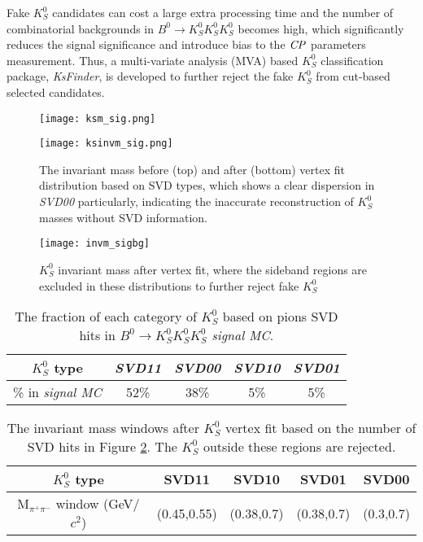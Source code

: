 Fake $K_S^0$ candidates can cost a large extra processing time and the number of combinatorial backgrounds in $B^0 \to K_S^0  K_S^0  K_S^0$ becomes high, which significantly reduces the signal significance and introduce bias to the $\it{CP}$ parameters measurement. Thus, a multi-variate analysis (MVA) based $K_S^0$ classification package, \textit{KsFinder}, is developed to further reject the fake $K_S^0$ from cut-based selected candidates.


\begin{figure}[htpb]
	\begin{minipage}[b]{1\linewidth}
		\centering 
		\texttt{[image: ksm\_sig.png]}
	\end{minipage}
	\begin{minipage}[b]{1\linewidth}
		\centering 
		\texttt{[image: ksinvm\_sig.png]}
	\end{minipage}
	\caption{The invariant mass before (top) and after (bottom) vertex fit distribution based on SVD types, which shows a clear dispersion in \textit{SVD00} particularly, indicating the inaccurate reconstruction of $K_S^0$ masses without SVD information.}
	\label{fig:invm1}
\end{figure}

\begin{figure}[htpb]
	\centering
	\texttt{[image: invm\_sigbg]}
	\caption{$K_S^0$ invariant mass after vertex fit, where the sideband regions are excluded in these distributions to further reject fake $K_S^0$}
	\label{fig:invm}
\end{figure}

\begin{table}[H]
	\centering
	\begin{tabular}{|c|c|c|c|c|}
		\hline
		$K_S^0$ type & \textit{SVD11} & \textit{SVD00} & \textit{SVD10} & \textit{SVD01}\\
		\hline
		\% in \textit{signal MC} & 52\% & 38\% & 5\% & 5\%\\
		\hline
	\end{tabular}
	\caption{The fraction of each category of $K_S^0$ based on pions SVD hits in $B^0 \to K_S^0  K_S^0  K_S^0$ \textit{signal MC}.}
	\label{tab:svdxx}
\end{table}

\begin{table}[h]
	\centering 
	\begin{tabular}{|c|c|c|c|c|} 
		\hline
		$K_S^0$ type & SVD11 & SVD10 & SVD01  & SVD00  \\
		\hline
		M$_{\pi^+\pi^-}$ window (GeV/$c^2$) & (0.45,0.55) & (0.38,0.7)  & (0.38,0.7)  & (0.3,0.7) \\
		\hline
	\end{tabular}
	\caption{The invariant mass windows after $K_S^0$ vertex fit based on the number of SVD hits in Figure \ref{fig:invm}. The $K_S^0$ outside these regions are rejected.}
	\label{tab:ks_invm}
\end{table}



